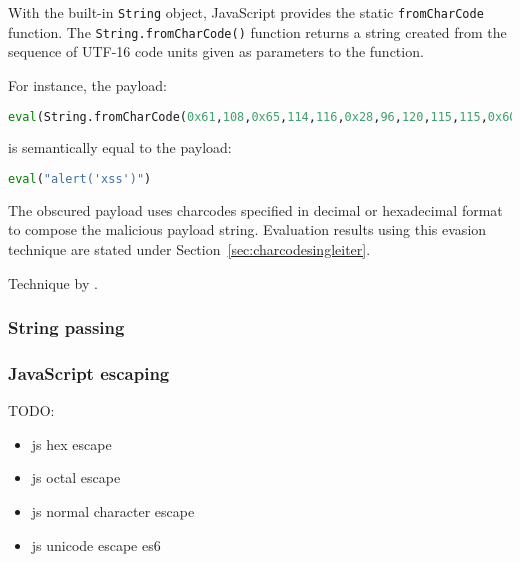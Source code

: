 With the built-in \verb|String| object, JavaScript provides the static \verb|fromCharCode| function. The \verb|String.fromCharCode()| function returns a string created from the sequence of UTF-16 code units given as parameters to the function. \cite{js/fromCharCode}

For instance, the payload:

\begin{lstlisting}[style=basicStyle, language=Python]
eval(String.fromCharCode(0x61,108,0x65,114,116,0x28,96,120,115,115,0x60,0x29))
\end{lstlisting}

is semantically equal to the payload:

\begin{lstlisting}[style=basicStyle, language=Python]
eval("alert('xss')")
\end{lstlisting}

The obscured payload uses charcodes specified in decimal or hexadecimal format to compose the malicious payload string. Evaluation results using this evasion technique are stated under Section~\ref{sec:charcodesingleiter}.

Technique by \cite{asecsite/jsobf1}.

\subsubsection{String passing}

\subsubsection{JavaScript escaping}
\label{sec:jsescape}
{\color{red} TODO:
	\begin{itemize}
		\item js hex escape
		\item js octal escape
		\item js normal character escape
		\item js unicode escape es6
	\end{itemize}
}

